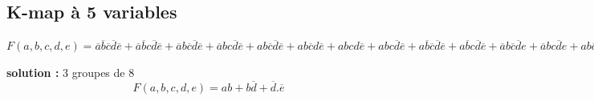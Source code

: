 \documentclass[a4paper,11pt]{article}
\begin{document}
\subsection{K-map à 5 variables}

$F(a,b,c,d,e)=\overline{a}\overline{b}\overline{c}\overline{d}\overline{e} +
              \overline{a}\overline{b}c\overline{d}\overline{e} +
              \overline{a}b\overline{c}\overline{d}\overline{e} +
              \overline{a}bc\overline{d}\overline{e} +
              ab\overline{c}\overline{d}\overline{e} +
              ab\overline{c}d\overline{e} +
              abcd\overline{e} +
              abc\overline{d}\overline{e} +
              a\overline{b}\overline{c}\overline{d}\overline{e} +
              a\overline{b}c\overline{d}\overline{e} +
              \overline{a}b\overline{c}\overline{d}e +
              \overline{a}bc\overline{d}e +
              ab\overline{c}\overline{d}e +
              ab\overline{c}de +
              abcde +
              abc\overline{d}e$

\begin{cadre}
{\bf solution :} 3 groupes de 8
$$F(a,b,c,d,e)=ab + b\overline{d} + \overline{d}.\overline{e}$$
\end{cadre}




\newpage
\end{document}
